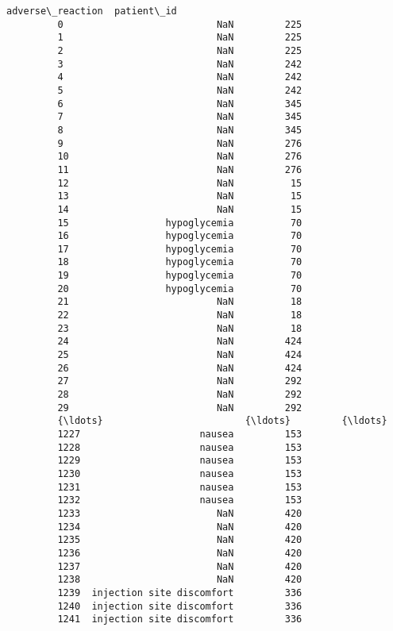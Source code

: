 \documentclass[11pt]{article}
\begin{document}
\begin{Verbatim}[commandchars=\\\{\}]
                        adverse\_reaction  patient\_id  
         0                           NaN         225  
         1                           NaN         225  
         2                           NaN         225  
         3                           NaN         242  
         4                           NaN         242  
         5                           NaN         242  
         6                           NaN         345  
         7                           NaN         345  
         8                           NaN         345  
         9                           NaN         276  
         10                          NaN         276  
         11                          NaN         276  
         12                          NaN          15  
         13                          NaN          15  
         14                          NaN          15  
         15                 hypoglycemia          70  
         16                 hypoglycemia          70  
         17                 hypoglycemia          70  
         18                 hypoglycemia          70  
         19                 hypoglycemia          70  
         20                 hypoglycemia          70  
         21                          NaN          18  
         22                          NaN          18  
         23                          NaN          18  
         24                          NaN         424  
         25                          NaN         424  
         26                          NaN         424  
         27                          NaN         292  
         28                          NaN         292  
         29                          NaN         292  
         {\ldots}                         {\ldots}         {\ldots}  
         1227                     nausea         153  
         1228                     nausea         153  
         1229                     nausea         153  
         1230                     nausea         153  
         1231                     nausea         153  
         1232                     nausea         153  
         1233                        NaN         420  
         1234                        NaN         420  
         1235                        NaN         420  
         1236                        NaN         420  
         1237                        NaN         420  
         1238                        NaN         420  
         1239  injection site discomfort         336  
         1240  injection site discomfort         336  
         1241  injection site discomfort         336  

\end{Verbatim}
\end{document}
